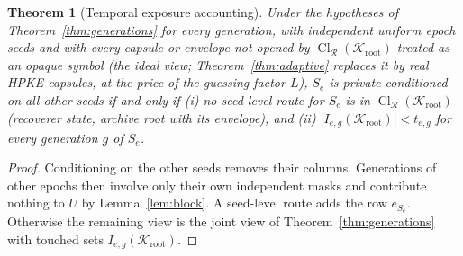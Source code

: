 \documentclass[pdflatex,sn-mathphys-num]{sn-jnl}%
\theoremstyle{plain}
\newtheorem{theorem}{Theorem}
\theoremstyle{definition}
\newcommand{\Cl}{\operatorname{Cl}}
\begin{document}
\begin{theorem}[Temporal exposure accounting]\label{thm:temporal}
Under the hypotheses of Theorem~\ref{thm:generations} for every generation, with independent uniform epoch seeds and with every capsule or envelope not opened by $\Cl_{\mathcal R}(\mathcal K_{\mathrm{root}})$ treated as an opaque symbol (the ideal view; Theorem~\ref{thm:adaptive} replaces it by real HPKE capsules, at the price of the guessing factor $L$), $S_e$ is private conditioned on all other seeds if and only if (i) no seed-level route for $S_e$ is in $\Cl_{\mathcal R}(\mathcal K_{\mathrm{root}})$ (recoverer state, archive root with its envelope), and (ii) $|I_{e,g}(\mathcal K_{\mathrm{root}})|<t_{e,g}$ for every generation $g$ of $S_e$.
\end{theorem}
\begin{proof}
Conditioning on the other seeds removes their columns. Generations of other epochs then involve only their own independent masks and contribute nothing to $U$ by Lemma~\ref{lem:block}. A seed-level route adds the row $e_{S_e}$. Otherwise the remaining view is the joint view of Theorem~\ref{thm:generations} with touched sets $I_{e,g}(\mathcal K_{\mathrm{root}})$.
\end{proof}
\end{document}
